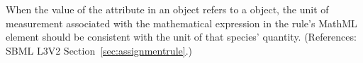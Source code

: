 When the value of the attribute  in an \AssignmentRule
object refers to a \Species object, the unit of measurement associated with
the mathematical expression in the rule's MathML  element
should be consistent with the unit of that species' quantity.  (References:
SBML L3V2 Section~\ref{sec:assignmentrule}.)
